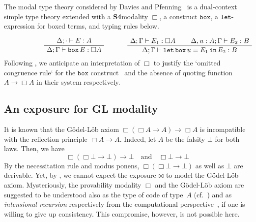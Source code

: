 \documentclass[a4paper,UKenglish,numberwithinsect,cleveref,thm-restate]{lipics-v2021}
\numberwithin{equation}{section}
\newcommand{\SFour}{\textbf{S4}}
\newcommand{\GL}{\textbf{GL}}
\theoremstyle{plain}
\begin{document}
\begin{remark}\label{remark:S4-modality}
The modal type theory considered by Davies and Pfenning~\cite{Davies2001b} is a dual-context simple type theory extended with a \SFour modality $\Box$, a construct $\mathtt{box}$, a $\mathtt{let}$-expression for boxed terms, and typing rules below.
\[
\begin{minipage}{.47\linewidth}
  \begin{prooftree}
    \AxiomC{$\Delta; \cdot \vdash E : A$}
    \UnaryInfC{$\Delta; \Gamma \vdash \mathtt{box}\,E:\Box A$}
  \end{prooftree}
\end{minipage}%
\begin{minipage}{0.47\linewidth}
  \begin{prooftree}
    \AxiomC{$\Delta; \Gamma \vdash E_1 : \Box A$}
    \AxiomC{$\Delta, u : A; \Gamma \vdash E_2 : B$}
  \BinaryInfC{$\Delta; \Gamma \vdash \mathtt{let}\,\mathtt{box}\, u = E_1\, \mathtt{in}\,E_2 : B$}
  \end{prooftree}
\end{minipage}
\]
Following , we anticipate an interpretation of $\Box$ to justify the `omitted congruence rule` for the $\mathtt{box}$ construct~\cite[Section~2.5]{Davies2001b} and the absence of quoting function $A \to \Box A$ in their system respectively.
\end{remark}

\subsection{An exposure for \texorpdfstring{\GL}{GL} modality}
It is known that the Gödel-Löb axiom $\Box(\Box A \to A) \to \Box A$ is incompatible with the reflection principle $\Box A \to A$.
Indeed, let $A$ be the falsity $\bot$ for both laws. Then, we have
\[
  \Box(\Box \bot \to \bot) \to \bot
  \quad\text{and}\quad
  \Box \bot \to \bot
\]
By the necessitation rule and modus ponens, $\Box (\Box \bot \to \bot)$ as well as $\bot$ are derivable.
Yet, by , we cannot expect the exposure $\boxtimes$ to model the Gödel-Löb axiom.
Mysteriously, the provability modality $\Box$ and the Gödel-Löb axiom are suggested to be understood also as the type of code of type~$A$ (cf.~) and as \emph{intensional recursion} respectively from the computational perspective~\cite{Kavvos2017b}, if one is willing to give up consistency.
This compromise, however, is not possible here.
\end{document}
